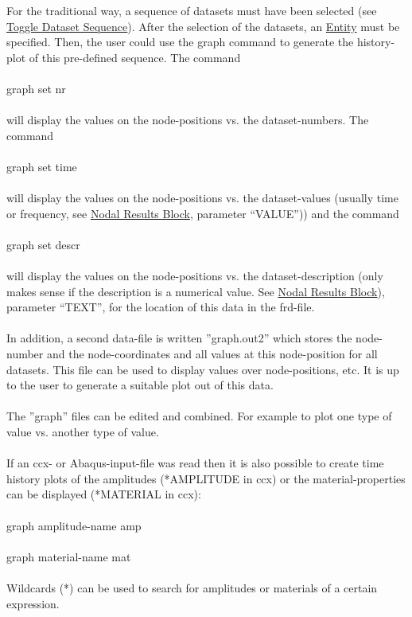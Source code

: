 \documentclass{article}
\providecommand{\htmlref}[2]{\hyperref[#2]{#1}}
\begin{document}
For the traditional way, a sequence of datasets must have been selected (see  \htmlref{Toggle Dataset Sequence}{Toggle Dataset Sequence}). After the selection of the datasets, an \htmlref{Entity}{Entity} must be specified. Then, the user could use the graph command to generate the history-plot of this pre-defined sequence. The command\\\\graph set nr\\\\will display the values on the node-positions vs. the dataset-numbers. The command\\\\graph set time\\\\will display the values on the node-positions vs. the dataset-values (usually time or frequency, see \htmlref{Nodal Results Block}{Nodal Results Block}, parameter ``VALUE'')) and the command\\\\graph set descr\\\\will display the values on the node-positions vs. the dataset-description (only makes sense if the description is a numerical value. See \htmlref{Nodal Results Block}{Nodal Results Block}), parameter ``TEXT'', for the location of this data in the frd-file.\\\\In addition, a second data-file is written ''graph.out2'' which stores the node-number and the node-coordinates and all values at this node-position for all datasets. This file can be used to display values over node-positions, etc. It is up to the user to generate a suitable plot out of this data.\\\\The ''graph'' files can be edited and combined. For example to plot one type of value vs. another type of value.\\\\

If an ccx- or Abaqus-input-file was read then it is also possible to create time history plots of the amplitudes (*AMPLITUDE in ccx) or the material-properties can be displayed (*MATERIAL in ccx):\\\\graph amplitude-name amp\\\\graph material-name mat\\\\Wildcards (*) can be used to search for amplitudes or materials of a certain expression.
\end{document}
